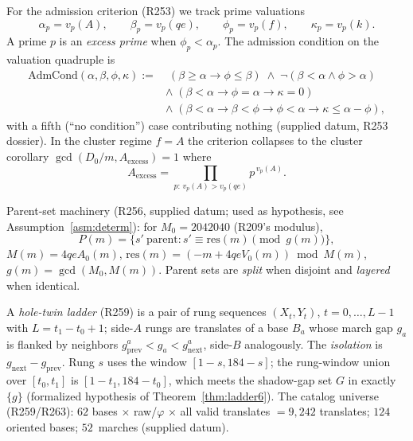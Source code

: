 \documentclass[11pt,a4paper]{article}
\theoremstyle{definition}
\begin{document}
For the admission criterion (R253) we track prime valuations
\begin{equation}
  \label{eq:valuations}
  \alpha_p=v_p(A),\qquad \beta_p=v_p(qe),\qquad
  \phi_p=v_p(f),\qquad \kappa_p=v_p(k).
\end{equation}
A prime $p$ is an \emph{excess prime} when $\phi_p<\alpha_p$. The
admission condition on the valuation quadruple is
\begin{align}
  \label{eq:AdmCond}
  \mathrm{AdmCond}(\alpha,\beta,\phi,\kappa)
  :=&\;(\beta\ge\alpha\to\phi\le\beta)\;\land\;
      \lnot(\beta<\alpha\land\phi>\alpha) \nonumber\\
  &\land\;(\beta<\alpha\to\phi=\alpha\to\kappa=0) \nonumber\\
  &\land\;(\beta<\alpha\to\beta<\phi\to\phi<\alpha\to\kappa\le\alpha-\phi),
\end{align}
with a fifth (``no condition'') case contributing nothing (supplied
datum, R253 dossier). In the cluster regime $f=A$ the criterion
collapses to the cluster corollary
$\gcd(D_0/m,A_{\mathrm{excess}})=1$ where
\begin{equation}
  \label{eq:Aexcess}
  A_{\mathrm{excess}}=\prod_{p:\,v_p(A)>v_p(qe)}p^{\,v_p(A)}.
\end{equation}

Parent-set machinery (R256, supplied datum; used as hypothesis, see
Assumption~\ref{asm:determ}): for $M_0=2042040$ (R209's modulus),
\begin{equation}
  \label{eq:parents}
  P(m)=\{s'\ \text{parent} : s'\equiv\mathrm{res}(m)\pmod{g(m)}\},
\end{equation}
$M(m)=4qeA_0(m)$,
$\mathrm{res}(m)=(-m+4qeV_0(m))\bmod M(m)$,
$g(m)=\gcd(M_0,M(m))$. Parent sets are \emph{split} when disjoint and
\emph{layered} when identical.

A \emph{hole-twin ladder} (R259) is a pair of rung sequences
$(X_t,Y_t)$, $t=0,\dots,L-1$ with $L=t_1-t_0+1$; side-$A$ rungs are
translates of a base $B_a$ whose march gap $g_a$ is flanked by neighbors
$g^a_{\mathrm{prev}}<g_a<g^a_{\mathrm{next}}$, side-$B$ analogously.
The \emph{isolation} is $g_{\mathrm{next}}-g_{\mathrm{prev}}$. Rung $s$
uses the window $[1-s,184-s]$; the rung-window union over $[t_0,t_1]$ is
$[1-t_1,184-t_0]$, which meets the shadow-gap set $G$ in exactly $\{g\}$
(formalized hypothesis of Theorem~\ref{thm:ladder6}). The catalog
universe (R259/R263): $62$ bases $\times$ raw/$\varphi$ $\times$ all
valid translates $=9{,}242$ translates; $124$ oriented bases;
$52$~marches (supplied datum).
\end{document}
